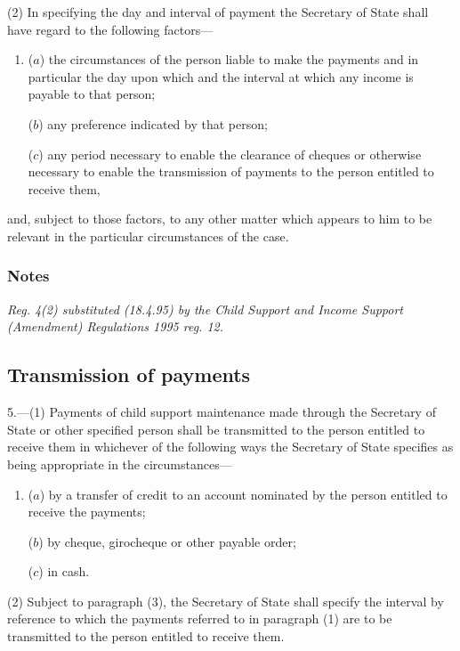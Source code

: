 \documentclass[a4paper]{article}
\newcommand\amendment[1]{\subsubsection*{Notes}{\itshape\frenchspacing\footnotesize #1 \par}}
\begin{document}
(2) In specifying the day and interval of payment the Secretary of State shall have regard to the following factors—
\begin{enumerate}\item[]
($a$) the circumstances of the person liable to make the payments and in particular the day upon which and the interval at which any income is payable to that person;

($b$) any preference indicated by that person;

($c$) any period necessary to enable the clearance of cheques or otherwise necessary to enable the transmission of payments to the person entitled to receive them,
\end{enumerate}
and, subject to those factors, to any other matter which appears to him to be relevant in the particular circumstances of the case.

\amendment{
Reg. 4(2) substituted (18.4.95) by the Child Support and Income Support (Amendment) Regulations 1995 reg. 12.
}

\subsection[5. Transmission of payments]{Transmission of payments}

5.—(1) Payments of child support maintenance made through the Secretary of State or other specified person shall be transmitted to the person entitled to receive them in whichever of the following ways the Secretary of State specifies as being appropriate in the circumstances—
\begin{enumerate}\item[]
($a$) by a transfer of credit to an account nominated by the person entitled to receive the payments;

($b$) by cheque, girocheque or other payable order;

($c$) in cash.
\end{enumerate}

(2) 
Subject to paragraph (3), the Secretary of State  %
shall specify the interval by reference to which the payments referred to in paragraph (1) are to be transmitted to the person entitled to receive them.

%
%
\end{document}
